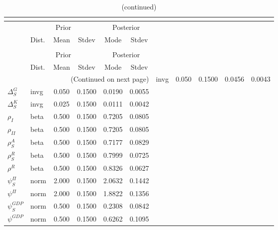  
\begin{center}
\begin{longtable}{llcccc} 
\caption{Results from posterior maximization (parameters)}\\
 \label{Table:Posterior:1}\\
\toprule 
  & \multicolumn{3}{c}{Prior}  &  \multicolumn{2}{c}{Posterior} \\
  \cmidrule(r{.75em}){2-4} \cmidrule(r{.75em}){5-6}
  & Dist. & Mean  & Stdev & Mode & Stdev \\ 
\midrule \endfirsthead 
\caption{(continued)}\\
 \bottomrule 
  & \multicolumn{3}{c}{Prior}  &  \multicolumn{2}{c}{Posterior} \\
  \cmidrule(r{.75em}){2-4} \cmidrule(r{.75em}){5-6}
  & Dist. & Mean  & Stdev & Mode & Stdev \\ 
\midrule \endhead 
\bottomrule \multicolumn{6}{r}{(Continued on next page)}\endfoot 
\bottomrule\endlastfoot 
${\Delta^{A}_{S}}$ & invg &   0.050 & 0.1500 &   0.0456 &  0.0043 \\ 
${\Delta^{G}_{S}}$ & invg &   0.050 & 0.1500 &   0.0190 &  0.0055 \\ 
${\Delta^{K}_{S}}$ & invg &   0.025 & 0.1500 &   0.0111 &  0.0042 \\ 
${\rho_{I}}$ & beta &   0.500 & 0.1500 &   0.7205 &  0.0805 \\ 
${\rho_{II}}$ & beta &   0.500 & 0.1500 &   0.7205 &  0.0805 \\ 
${\rho^{A}_{S}}$ & beta &   0.500 & 0.1500 &   0.7177 &  0.0829 \\ 
${\rho^{R}_{S}}$ & beta &   0.500 & 0.1500 &   0.7999 &  0.0725 \\ 
${\rho^{R}}$ & beta &   0.500 & 0.1500 &   0.8326 &  0.0627 \\ 
${\psi^{\Pi}_{S}}$ & norm &   2.000 & 0.1500 &   2.0632 &  0.1442 \\ 
${\psi^{\Pi}}$ & norm &   2.000 & 0.1500 &   1.8822 &  0.1356 \\ 
${\psi^{GDP}_{S}}$ & norm &   0.500 & 0.1500 &   0.2308 &  0.0842 \\ 
${\psi^{GDP}}$ & norm &   0.500 & 0.1500 &   0.6262 &  0.1095 \\ 
\end{longtable}
 \end{center}
